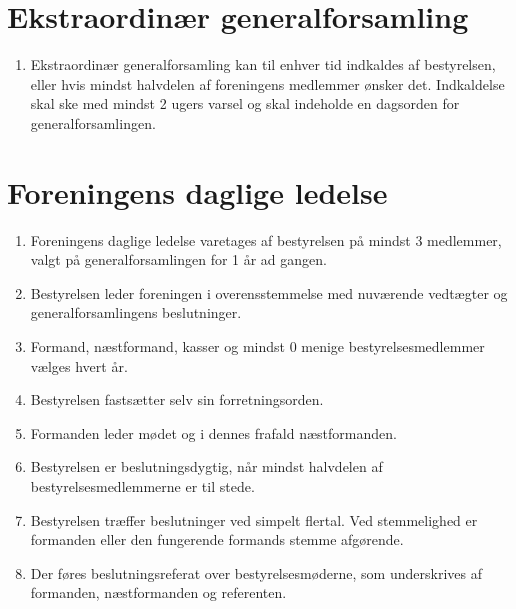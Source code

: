 \documentclass[a4paper, 10pt]{article}
\newenvironment{stykenum}{
  \begin{enumerate}[%
    label=Stk.~\arabic*:, ref=\textsection~\theenumi~Stk.~\arabic*, start=1]
}{\end{enumerate}}
\begin{document}
\section{Ekstraordinær generalforsamling}
\begin{stykenum}
    \item Ekstraordinær generalforsamling kan til enhver tid indkaldes af
        bestyrelsen, eller hvis mindst halvdelen af foreningens medlemmer ønsker
        det. Indkaldelse skal ske med mindst 2 ugers varsel og skal indeholde en
        dagsorden for generalforsamlingen.
\end{stykenum}

\section{Foreningens daglige ledelse}
\begin{stykenum}
    \item Foreningens daglige ledelse varetages af bestyrelsen på mindst 3
        medlemmer, valgt på generalforsamlingen for 1 år ad gangen.

    \item Bestyrelsen leder foreningen i overensstemmelse med nuværende
        vedtægter og generalforsamlingens beslutninger.

    \item Formand, næstformand, kasser og mindst 0 menige bestyrelsesmedlemmer
        vælges hvert år.

    \item Bestyrelsen fastsætter selv sin forretningsorden.

    \item Formanden leder mødet og i dennes frafald næstformanden.

    \item Bestyrelsen er beslutningsdygtig, når mindst halvdelen af
        bestyrelsesmedlemmerne er til stede.

    \item Bestyrelsen træffer beslutninger ved simpelt flertal. Ved stemmelighed
        er formanden eller den fungerende formands stemme afgørende.

    \item Der føres beslutningsreferat over bestyrelsesmøderne, som underskrives
        af formanden, næstformanden og referenten.
\end{stykenum}
\end{document}
